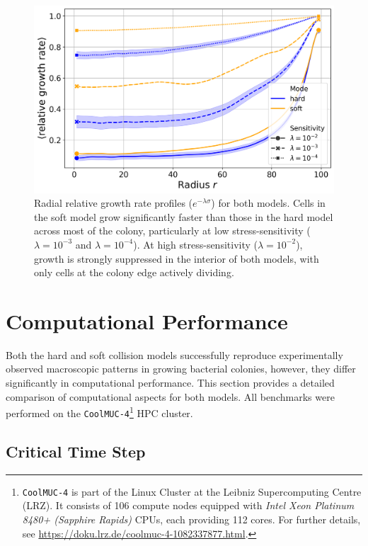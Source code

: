 \documentclass[conference]{IEEEtran}
\begin{document}
\begin{figure}[H]
    \centering
    \includegraphics[width=\linewidth]{figures/comparison_plots/combined_radial_impedance.png}
    \caption{Radial relative growth rate profiles ($e^{-\lambda \sigma}$) for both models. Cells in the soft model grow significantly faster than those in the hard model across most of the colony, particularly at low stress-sensitivity ($\lambda = 10^{-3}$ and $\lambda = 10^{-4}$). At high stress-sensitivity ($\lambda = 10^{-2}$), growth is strongly suppressed in the interior of both models, with only cells at the colony edge actively dividing.}
    \label{fig:radial_distribution_growth_rate}
\end{figure}


\section{Computational Performance}
\label{sec:performance_analysis}

Both the hard and soft collision models successfully reproduce experimentally observed macroscopic patterns in growing bacterial colonies, however, they differ significantly in computational performance. This section provides a detailed comparison of computational aspects for both models. All benchmarks were performed on the \texttt{CoolMUC-4}\footnote{\texttt{CoolMUC-4} is part of the Linux Cluster at the Leibniz Supercomputing Centre (LRZ). It consists of 106 compute nodes equipped with \textit{Intel Xeon Platinum 8480+ (Sapphire Rapids)} CPUs, each providing 112 cores. For further details, see \url{https://doku.lrz.de/coolmuc-4-1082337877.html}.} HPC cluster.

\subsection{Critical Time Step}
\end{document}
